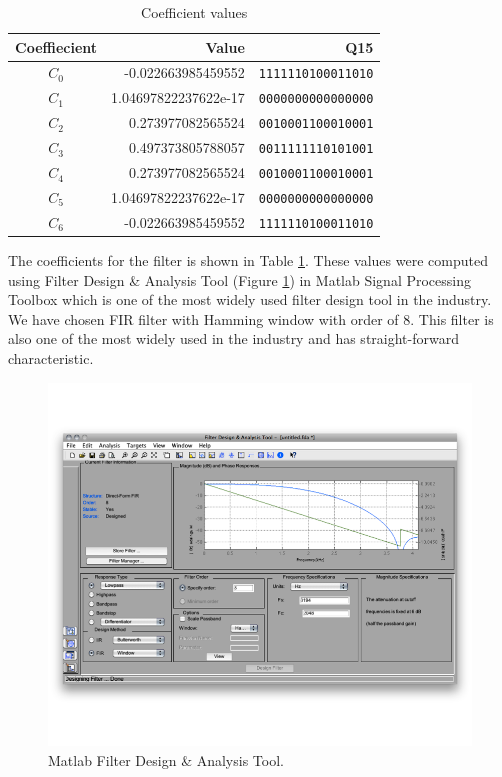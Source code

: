 \begin{table}[htbp]
\centering
\begin{tabular}{ c | r | r }
\hline
Coeffiecient & Value & Q15 \\
\hline \hline
$C_0$ & -0.022663985459552   & \texttt{1111110100011010} \\
$C_1$ & 1.04697822237622e-17 & \texttt{0000000000000000} \\
$C_2$ & 0.273977082565524    & \texttt{0010001100010001}\\
$C_3$ & 0.497373805788057    & \texttt{0011111110101001}\\
$C_4$ & 0.273977082565524    & \texttt{0010001100010001}\\
$C_5$ & 1.04697822237622e-17 & \texttt{0000000000000000} \\
$C_6$ & -0.022663985459552   & \texttt{1111110100011010} \\
\end{tabular}
\caption{Coefficient values}
\label{tab:coefficients}
\end{table}

The coefficients for the filter is shown in Table \ref{tab:coefficients}. These values were computed using Filter Design \& Analysis Tool (Figure \ref{fig:matlab}) in Matlab Signal Processing Toolbox which is one of the most widely used filter design tool in the industry. We have chosen FIR filter with Hamming window with order of 8. This filter is also one of the most widely used in the industry and has straight-forward characteristic.

\begin{figure}[htbp]
	\centering
	\includegraphics[width=6.5in]{images/matlab}
	\caption{Matlab Filter Design \& Analysis Tool.}
	\label{fig:matlab}
\end{figure}
